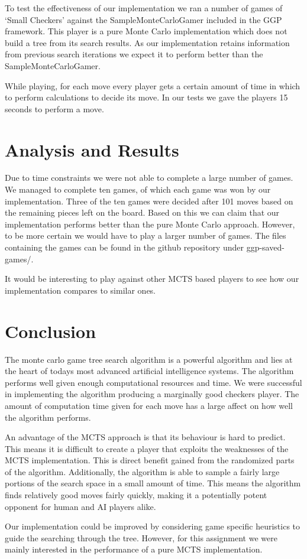 \documentclass[compressed,final,notitlepage,narroweqnarray,inline,twoside,]{ieee}
\begin{document}
To test the effectiveness of our implementation we ran a number of games of ‘Small Checkers’ against the SampleMonteCarloGamer included in the GGP framework. This player is a pure Monte Carlo implementation which does not build a tree from its search results. As our implementation retains information from previous search iterations we expect it to perform better than the SampleMonteCarloGamer.

While playing, for each move every player gets a certain amount of time in which to perform calculations to decide its move. In our tests we gave the players 15 seconds to perform a move.

\section{Analysis and Results}
Due to time constraints we were not able to complete a large number of games. We managed to complete ten games, of which each game was won by our implementation. Three of the ten games were decided after 101 moves based on the remaining pieces left on the board. Based on this we can claim that our implementation performs better than the pure Monte Carlo approach. However, to be more certain we would have to play a larger number of games. The files containing the games can be found in the github repository under ggp-saved-games/.

It would be interesting to play against other MCTS based players to see how our implementation compares to similar ones.

\section{Conclusion}
The monte carlo game tree search algorithm is a powerful algorithm and lies at the heart of todays most advanced artificial intelligence systems. The algorithm performs well given enough computational resources and time. We were successful in implementing the algorithm producing a marginally good checkers player. The amount of computation time given for each move has a large affect on how well the algorithm performs.

An advantage of the MCTS approach is that its behaviour is hard to predict. This means it is difficult to create a player that exploits the weaknesses of the MCTS implementation. This is direct benefit gained from the randomized parts of the algorithm. Additionally, the algorithm is able to sample a fairly large portions of the search space in a small amount of time. This means the algorithm finds relatively good moves fairly quickly, making it a potentially potent opponent for human and AI players alike.

Our implementation could be improved by considering game specific heuristics to guide the searching through the tree. However, for this assignment we were mainly interested in the performance of a pure MCTS implementation.


 
\end{document}
